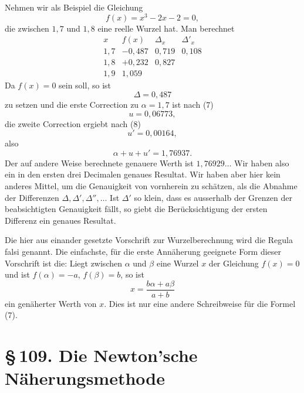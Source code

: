 \documentclass[11pt]{article}
\providecommand{\sect}[2]{\section*{\S\,#1. #2}}
\begin{document}
Nehmen wir als Beispiel die Gleichung
\[
        f(x)=x^3-2x-2=0,
\]
die zwischen $1{,}7$ und $1{,}8$ eine reelle Wurzel hat. Man berechnet
\[
\begin{array}{c|c|c|c}
x&f(x)&\Delta_x&\Delta'_x\\ \hline
1{,}7&-0{,}487&0{,}719&0{,}108\\
1{,}8&+0{,}232&0{,}827&\\
1{,}9&1{,}059&&
\end{array}
\]
Da $f(x)=0$ sein soll, so ist
\[
        \Delta=0{,}487
\]
zu setzen und die erste Correction zu $\alpha=1{,}7$ ist nach (7)
\[
        u=0{,}06773,
\]
die zweite Correction ergiebt nach (8)
\[
        u'=0{,}00164,
\]
also
\[
        \alpha+u+u'=1{,}76937.
\]
Der auf andere Weise berechnete genauere Werth ist $1{,}76929\ldots$ Wir haben also ein in den ersten drei Decimalen genaues Resultat. Wir haben aber hier kein anderes Mittel, um die Genauigkeit von vornherein zu schätzen, als die Abnahme der Differenzen $\Delta,\Delta',\Delta'',\ldots$ Ist $\Delta'$ so klein, dass es ausserhalb der Grenzen der beabsichtigten Genauigkeit fällt, so giebt die Berücksichtigung der ersten Differenz ein genaues Resultat.

Die hier aus einander gesetzte Vorschrift zur Wurzelberechnung wird die Regula falsi genannt. Die einfachste, für die erste Annäherung geeignete Form dieser Vorschrift ist die: Liegt zwischen $\alpha$ und $\beta$ eine Wurzel $x$ der Gleichung $f(x)=0$ und ist $f(\alpha)=-a$, $f(\beta)=b$, so ist
\begin{equation}
        x=\frac{b\alpha+a\beta}{a+b}
\tag{9}
\end{equation}
ein genäherter Werth von $x$. Dies ist nur eine andere Schreibweise für die Formel (7).

\sect{109}{Die Newton'sche Näherungsmethode}
\end{document}
